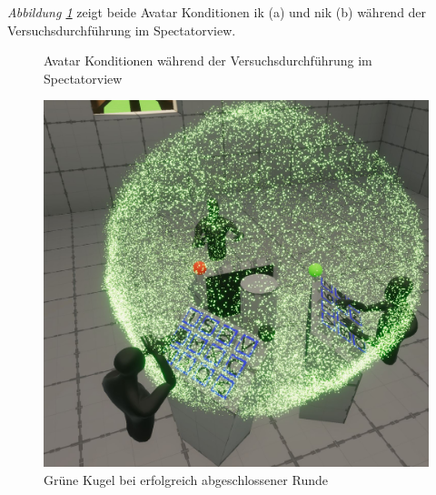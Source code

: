\documentclass[a4paper,11pt]{article}%
\renewcommand{\\}{\vspace*{0.5\baselineskip} \newline}
\begin{document}
\textit{Abbildung \ref{AvatareImEinsatz}} zeigt beide Avatar Konditionen \ac{ik} (a) und \ac{nik} (b) während der Versuchsdurchführung im Spectatorview.

\begin{figure}[h]
  \centering
  \qquad
  \caption[Die Avatare und der Spectatorview]{Avatar Konditionen während der Versuchsdurchführung im Spectatorview}
  \label{AvatareImEinsatz}
\end{figure}

\begin{figure}[H]
		\begin{footnotesize}
		\centering
			\includegraphics[scale=0.2]{Abbildungen/RoundSuccsessful.JPG}	
			\caption[Der Abschluss einer Runde]{Grüne Kugel bei erfolgreich abgeschlossener Runde}
			\label{RoundFinished}
		\end{footnotesize}
	\end{figure}
	
\end{document}
